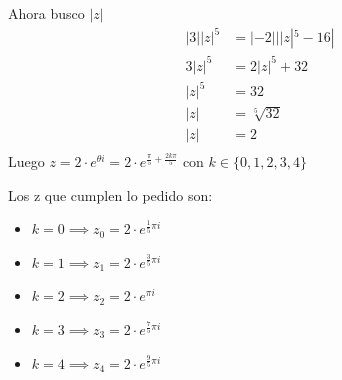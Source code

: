 Ahora busco $ |z| $
\begin{align*}
    |3||z|^5 &= |-2|||z|^5 - 16| \\
    3|z|^5 &= 2|z|^5 + 32 \\
    |z|^5 &= 32 \\
    |z| &= \sqrt[5]{32} \\
    |z| &= 2 \\
\end{align*}
Luego $ z = 2 \cdot e^{\theta i} = 2 \cdot e^{\frac{\pi}{5} + \frac{2k\pi}{5}} $ con $ k \in \{0,1,2,3,4\} $

Los z que cumplen lo pedido son:
\begin{itemize}
    \item $ k = 0 \implies z_0 = 2 \cdot e^{\frac{1}{5}\pi i} $
    \item $ k = 1 \implies z_1 = 2 \cdot e^{\frac{3}{5}\pi i} $
    \item $ k = 2 \implies z_2 = 2 \cdot e^{\pi i} $
    \item $ k = 3 \implies z_3 = 2 \cdot e^{\frac{7}{5}\pi i} $
    \item $ k = 4 \implies z_4 = 2 \cdot e^{\frac{9}{5}\pi i} $
\end{itemize}


